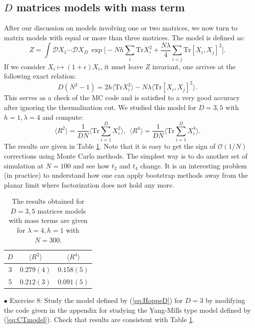 \documentclass[11pt]{article}
\begin{document}
\subsection{\label{subsec:ext_Hoppe}$D$ matrices models with mass term}
After our discussion on models involving one or two matrices, we now turn to matrix models 
with equal or more than three matrices. The model is defined as:
\begin{equation}
\label{eq:HoppeD} 
	Z = \int \mathcal{D}X_1 \cdots \mathcal{D}X_D ~
	\exp\Big[ -Nh\sum_{i}\mbox{Tr}X_{i}^{2} + \frac{N\lambda}{4} \sum_{i < j} \mbox{Tr} [X_i,X_j]^{2}\Big]. 
\end{equation}
If we consider $X_i \mapsto (1+\epsilon) X_i$, it must leave $Z$ invariant, one arrives at the following exact relation: 
\begin{equation}
	D(N^2 -1) = 2 h \langle \mbox{Tr}X_{i}^{2} \rangle 
	- N \lambda \langle \mbox{Tr}[X_i,X_j]^{2} \rangle. 
\end{equation}
This serves as a check of the MC code and is satisfied to a very good accuracy
after ignoring the thermalization cut. We studied this model for $D=3,5$ with 
$h=1, \lambda=4$ and compute: 
\begin{equation}
\label{eq:R2R4} 
	\langle R^2 \rangle =   \frac{1}{DN} \Bigg \langle \mbox{Tr} \sum_{i=1}^{D} X_{i}^2 \bigg \rangle, 
	~~ \langle R^4 \rangle =   \frac{1}{DN} \Bigg \langle \mbox{Tr} \sum_{i=1}^{D} X_{i}^4 \bigg \rangle.  
\end{equation}
The results are given in Table \ref{table:D_YMM_data}. Note that it is easy to get the sign of $\mathcal{O}(1/N)$ corrections using Monte Carlo methods. The simplest way is to do another set of simulation at $N = 100$ and see how $t_{2}$ and 
$t_{4}$ change. It is an interesting problem (in practice) 
to understand how one can apply bootstrap methods 
away from the planar limit where factorization does not hold any more.

\begin{table}[h!]
	\centering
	\begin{tabular}{||c c c||} 
		\hline
		$D$ & $ \langle R^2 \rangle$ & $ \langle R^4 \rangle$ \\ [0.5ex] 
		\hline\hline
		3 & $ 0.279(4) $ & $ 0.158(5) $  \\ 
		5 & $ 0.212(3) $ & $ 0.091(5) $
		 \\ [1ex] 
		\hline 
	\end{tabular}
\caption{The results obtained for $D = 3,5$ matrices models with mass terms are given for $\lambda=4, h=1$ with $N=300$.}
\label{table:D_YMM_data}
\end{table}
\begin{mdframed}[backgroundcolor=blue!3] 
	\textsc{} 
	$\bullet$ Exercise 8: Study the model defined by (\ref{eq:HoppeD}) for $D=3$ by modifying the code given in the appendix for studying the Yang-Mills type model defined by (\ref{eq:CTmodel}). Check that results are consistent with Table \ref{table:D_YMM_data}.  
\end{mdframed}
\end{document}
